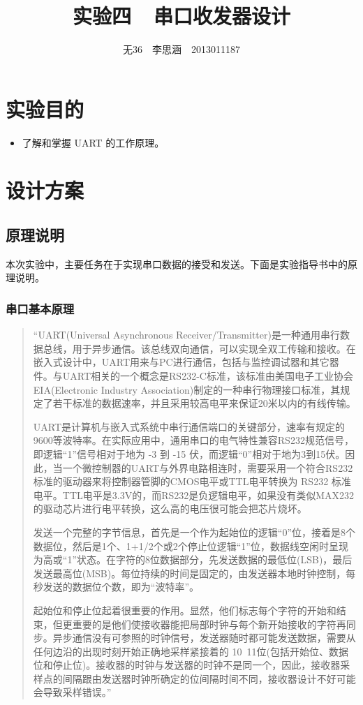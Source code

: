 \documentclass[11pt,a4paper]{article}
\begin{document}
\title{实验四\ \ 串口收发器设计}
\author{无36$\quad$李思涵$\quad$2013011187}
\maketitle

\section{实验目的}
\begin{itemize}
  \item 了解和掌握 UART 的工作原理。
\end{itemize}

\section{设计方案}
\subsection{原理说明}
本次实验中，主要任务在于实现串口数据的接受和发送。下面是实验指导书中的原理说明。

\subsubsection{串口基本原理}
\begin{quotation}
  “UART(Universal Asynchronous Receiver/Transmitter)是一种通用串行数据总线，用于异步通信。该总线双向通信，可以实现全双工传输和接收。在嵌入式设计中，UART用来与PC进行通信，包括与监控调试器和其它器件。与UART相关的一个概念是RS232-C标准，该标准由美国电子工业协会EIA(Electronic Industry Association)制定的一种串行物理接口标准，其规定了若干标准的数据速率，并且采用较高电平来保证20米以内的有线传输。

  UART是计算机与嵌入式系统中串行通信端口的关键部分，速率有规定的9600等波特率。在实际应用中，通用串口的电气特性兼容RS232规范信号，即逻辑“1”信号相对于地为 -3 到 -15 伏，而逻辑“0”相对于地为3到15伏。因此，当一个微控制器的UART与外界电路相连时，需要采用一个符合RS232标准的驱动器来将控制器管脚的CMOS电平或TTL电平转换为 RS232 标准电平。TTL电平是3.3V的，而RS232是负逻辑电平，如果没有类似MAX232的驱动芯片进行电平转换，这么高的电压很可能会把芯片烧坏。

  发送一个完整的字节信息，首先是一个作为起始位的逻辑“0”位，接着是8个数据位，然后是1个、1+1/2个或2个停止位逻辑“1”位，数据线空闲时呈现为高或“1”状态。在字符的8位数据部分，先发送数据的最低位(LSB)，最后发送最高位(MSB)。每位持续的时间是固定的，由发送器本地时钟控制，每秒发送的数据位个数，即为“波特率”。

  起始位和停止位起着很重要的作用。显然，他们标志每个字符的开始和结束，但更重要的是他们使接收器能把局部时钟与每个新开始接收的字符再同步。异步通信没有可参照的时钟信号，发送器随时都可能发送数据，需要从任何边沿的出现时刻开始正确地采样紧接着的 10~11位(包括开始位、数据位和停止位)。接收器的时钟与发送器的时钟不是同一个，因此，接收器采样点的间隔跟由发送器时钟所确定的位间隔时间不同，接收器设计不好可能会导致采样错误。”
\end{quotation}
\end{document}
